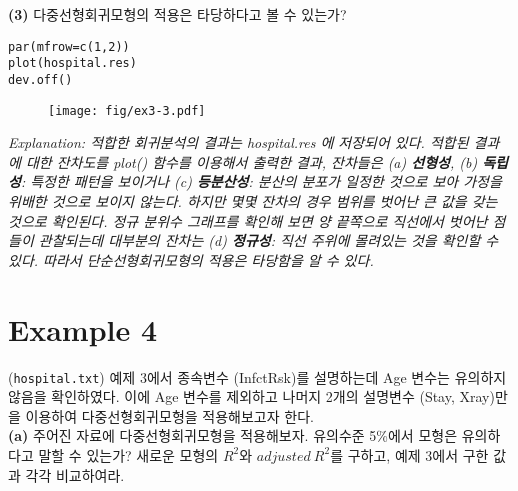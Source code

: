\documentclass{article}
\begin{document}
\textbf{(3)} 다중선형회귀모형의 적용은 타당하다고 볼 수 있는가?

\begin{lstlisting}[style={r-style}]
par(mfrow=c(1,2))
plot(hospital.res)
dev.off()
\end{lstlisting}
\begin{figure}[htb!]
    \centering
    \texttt{[image: fig/ex3-3.pdf]}
\end{figure}
\emph{Explanation: 적합한 회귀분석의 결과는 hospital.res 에 저장되어 있다. 적합된 결과에 대한 잔차도를 plot() 함수를 이용해서 출력한 결과, 잔차들은 (a) \textbf{선형성}, (b) \textbf{독립성}: 특정한 패턴을 보이거나 (c) \textbf{등분산성}: 분산의 분포가 일정한 것으로 보아 가정을 위배한 것으로 보이지 않는다. 하지만 몇몇 잔차의 경우 범위를 벗어난 큰 값을 갖는 것으로 확인된다. 정규 분위수 그래프를 확인해 보면 양 끝쪽으로 직선에서 벗어난 점들이 관찰되는데 대부분의 잔차는 (d) \textbf{정규성}: 직선 주위에 몰려있는 것을 확인할 수 있다. 따라서 단순선형회귀모형의 적용은 타당함을 알 수 있다.} \\

\section*{Example 4}
(\texttt{hospital.txt}) 예제 3에서 종속변수 (InfctRsk)를 설명하는데 Age 변수는 유의하지 않음을
확인하였다. 이에 Age 변수를 제외하고 나머지 2개의 설명변수 (Stay, Xray)만을 이용하여 다중선형회귀모형을 적용해보고자 한다. \\

\textbf{(a)} 주어진 자료에 다중선형회귀모형을 적용해보자. 유의수준 5\%에서 모형은 유의하다고
말할 수 있는가? 새로운 모형의 $R^2$와 $adjusted \ R^2$를 구하고, 예제 3에서 구한 값과 각각 비교하여라.
\end{document}
